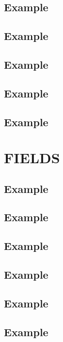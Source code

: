 \subsection*{\textbf{Example}}
\label{sec:7}
\subsection*{\textbf{Example}}
\label{sec:8}
\subsection*{\textbf{Example}}
\label{sec:9}
\subsection*{\textbf{Example}}
\label{sec:10}
\subsection*{\textbf{Example}}
\label{sec:11}


\section{FIELDS}

\subsection*{\textbf{Example}}
\label{sec:12}


\subsection*{\textbf{Example}}
\label{sec:14}
\subsection*{\textbf{Example}}
\label{sec:15}
\subsection*{\textbf{Example}}
\label{sec:16}
\subsection*{\textbf{Example}}
\label{sec:17}
\subsection*{\textbf{Example}}
\label{sec:18}


